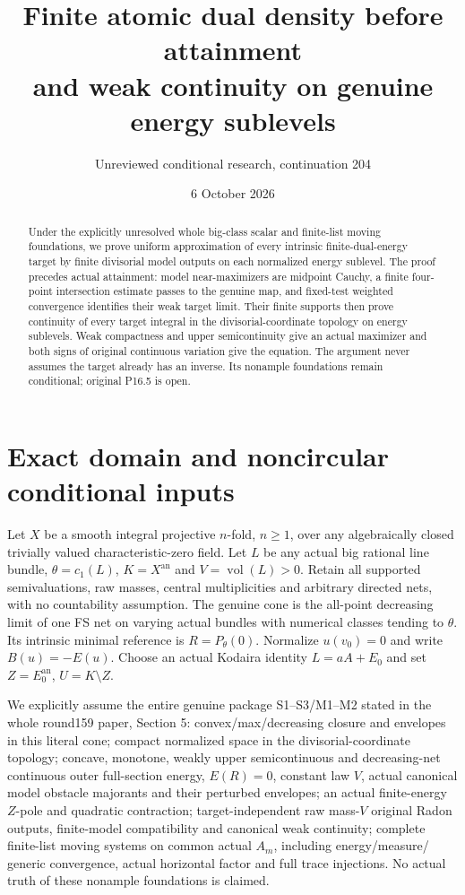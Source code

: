 \documentclass[11pt]{article}
\title{Finite atomic dual density before attainment\protect\\
and weak continuity on genuine energy sublevels}
\author{Unreviewed conditional research, continuation 204}
\date{6 October 2026}
\newcommand{\vol}{\operatorname{vol}}
\begin{document}
\maketitle
\begin{abstract}
Under the explicitly unresolved whole big-class scalar and finite-list
moving foundations, we prove uniform approximation of every intrinsic
finite-dual-energy target by finite divisorial model outputs on each
normalized energy sublevel. The proof precedes actual attainment:
model near-maximizers are midpoint Cauchy, a finite four-point
intersection estimate passes to the genuine map, and fixed-test
weighted convergence identifies their weak target limit.
Their finite supports then prove continuity of every target integral
in the divisorial-coordinate topology on energy sublevels.
Weak compactness and upper semicontinuity give an actual maximizer
and both signs of original continuous variation give the equation.
The argument never assumes the target already has an inverse.
Its nonample foundations remain conditional; original P16.5 is open.
\end{abstract}

\section{Exact domain and noncircular conditional inputs}
Let $X$ be a smooth integral projective $n$-fold, $n\geq1$, over
any algebraically closed trivially valued characteristic-zero field.
Let $L$ be any actual big rational line bundle,
$\theta=c_1(L)$, $K=X^{\mathrm{an}}$ and $V=\vol(L)>0$.
Retain all supported semivaluations, raw masses, central multiplicities
and arbitrary directed nets, with no countability assumption.
The genuine cone is the all-point decreasing limit of one FS net
on varying actual bundles with numerical classes tending to $\theta$.
Its intrinsic minimal reference is $R=P_\theta(0)$.
Normalize $u(v_0)=0$ and write $B(u)=-E(u)$.
Choose an actual Kodaira identity $L=aA+E_0$ and set
$Z=E_0^{\mathrm{an}}$, $U=K\setminus Z$.

We explicitly assume the entire genuine package S1--S3/M1--M2
stated in the whole round159 paper, Section 5:
convex/max/decreasing closure and envelopes in this literal cone;
compact normalized space in the divisorial-coordinate topology;
concave, monotone, weakly upper semicontinuous and decreasing-net
continuous outer full-section energy, $E(R)=0$, constant law $V$,
actual canonical model obstacle majorants and their perturbed
envelopes; an actual finite-energy $Z$-pole and quadratic contraction;
target-independent raw mass-$V$ original Radon outputs, finite-model
compatibility and canonical weak continuity; complete finite-list
moving systems on common actual $A_m$, including energy/measure/
generic convergence, actual horizontal factor and full trace
injections. No actual truth of these nonample foundations is claimed.
\end{document}
